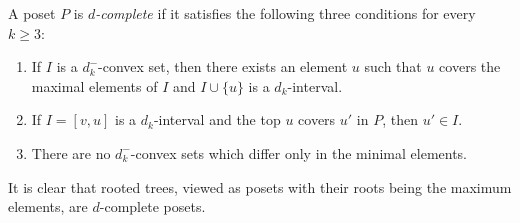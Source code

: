 \begin{defi}
\label{def:dc_poset}
A poset $P$ is \emph{$d$-complete} if it satisfies 
the following three conditions for every $k \ge 3$:
\begin{enumerate}[(D1)]
\item\label{defi2.1_D1} %
If $I$ is a $d_k^-$-convex set, then there exists an element $u$ 
such that $u$ covers the maximal elements of $I$ and 
$I \cup \{ u \}$ is a $d_k$-interval.
\item\label{defi2.1_D2} %
If $I = [v,u]$ is a $d_k$-interval and the top $u$ covers $u'$ in $P$, 
then $u' \in I$.
\item\label{defi2.1_D3} %
There are no $d_k^-$-convex sets which differ only in the minimal elements.
\end{enumerate}
\end{defi}

It is clear that rooted trees, viewed as posets with their roots being the maximum elements, 
are $d$-complete posets.

